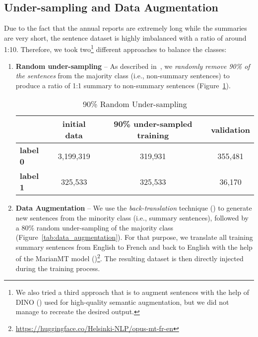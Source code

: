 \subsection{Under-sampling and Data Augmentation}\label{subsec:data_augmentation}
Due to the fact that the annual reports are extremely long while the summaries are very short, the sentence dataset is highly imbalanced with a ratio of around 1:10.
Therefore, we took two\footnote{
    We also tried a third approach that is to augment sentences with the help of DINO (\cite{schick2021generating}) used for high-quality
    semantic augmentation, but we did not manage to recreate the desired output.
} different approaches to balance the classes:
\begin{enumerate}
    \item \textbf{Random under-sampling} -- As described in~\cite{weiss2013foundations, wongvorachan2023undersampling}, we \emph{randomly remove 90\% of the sentences} from the majority class (i.e., non-summary sentences) to produce a ratio of 1:1 summary to non-summary sentences (Figure~\ref{tab:random_under_sampling}).
    \begin{table}[ht]
        \centering
        \begin{tabular}{lccc}
            \toprule
                & \textbf{initial data} & \textbf{90\% under-sampled training} & \textbf{validation} \\
            \midrule
                \textbf{label 0} & 3,199,319 & 319,931 & 355,481 \\
                \textbf{label 1} & 325,533 & 325,533 & 36,170 \\
            \bottomrule
        \end{tabular}
        \caption{90\% Random Under-sampling}\label{tab:random_under_sampling}
    \end{table}
    \item \textbf{Data Augmentation} -- We use the \emph{back-translation} technique (\cite{hoang-etal-2018-iterative}) to generate new sentences from the minority class (i.e., summary sentences), followed by a 80\% random under-sampling of the majority class (Figure~\ref{tab:data_augmentation}).
    For that purpose, we translate all training summary sentences from English to French and back to English with the help of the MarianMT model (\cite{junczysdowmunt2018marian})\footnote{\url{https://huggingface.co/Helsinki-NLP/opus-mt-fr-en}}.
    The resulting dataset is then directly injected during the training process.
    \begin{table}[ht]

\end{table}
\end{enumerate}
